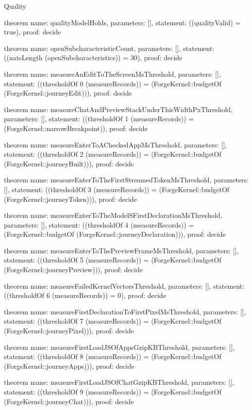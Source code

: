 \begin{lexlean}{Quality}
\begin{semanticmodule}
theorem{
  name: qualityModelHolds,
  parameters: [],
  statement: ((qualityValid) = true),
  proof: decide{}
}

theorem{
  name: openSubcharacteristicCount,
  parameters: [],
  statement: ((natsLength (openSubcharacteristics)) = 30),
  proof: decide{}
}

theorem{
  name: measureAnEditToTheScreenMsThreshold,
  parameters: [],
  statement: ((thresholdOf 0 (measureRecords)) = (ForgeKernel::budgetOf (ForgeKernel::journeyEdit))),
  proof: decide{}
}

theorem{
  name: measureChatAndPreviewStackUnderThisWidthPxThreshold,
  parameters: [],
  statement: ((thresholdOf 1 (measureRecords)) = (ForgeKernel::narrowBreakpoint)),
  proof: decide{}
}

theorem{
  name: measureEnterToACheckedAppMsThreshold,
  parameters: [],
  statement: ((thresholdOf 2 (measureRecords)) = (ForgeKernel::budgetOf (ForgeKernel::journeyBuilt))),
  proof: decide{}
}

theorem{
  name: measureEnterToTheFirstStreamedTokenMsThreshold,
  parameters: [],
  statement: ((thresholdOf 3 (measureRecords)) = (ForgeKernel::budgetOf (ForgeKernel::journeyToken))),
  proof: decide{}
}

theorem{
  name: measureEnterToTheModelSFirstDeclarationMsThreshold,
  parameters: [],
  statement: ((thresholdOf 4 (measureRecords)) = (ForgeKernel::budgetOf (ForgeKernel::journeyDeclaration))),
  proof: decide{}
}

theorem{
  name: measureEnterToThePreviewFrameMsThreshold,
  parameters: [],
  statement: ((thresholdOf 5 (measureRecords)) = (ForgeKernel::budgetOf (ForgeKernel::journeyPreview))),
  proof: decide{}
}

theorem{
  name: measureFailedKernelVectorsThreshold,
  parameters: [],
  statement: ((thresholdOf 6 (measureRecords)) = 0),
  proof: decide{}
}

theorem{
  name: measureFirstDeclarationToFirstPixelMsThreshold,
  parameters: [],
  statement: ((thresholdOf 7 (measureRecords)) = (ForgeKernel::budgetOf (ForgeKernel::journeyPixel))),
  proof: decide{}
}

theorem{
  name: measureFirstLoadJSOfAppsGzipKBThreshold,
  parameters: [],
  statement: ((thresholdOf 8 (measureRecords)) = (ForgeKernel::budgetOf (ForgeKernel::journeyApps))),
  proof: decide{}
}

theorem{
  name: measureFirstLoadJSOfChatGzipKBThreshold,
  parameters: [],
  statement: ((thresholdOf 9 (measureRecords)) = (ForgeKernel::budgetOf (ForgeKernel::journeyChat))),
  proof: decide{}
}


\end{semanticmodule}
\end{lexlean}
